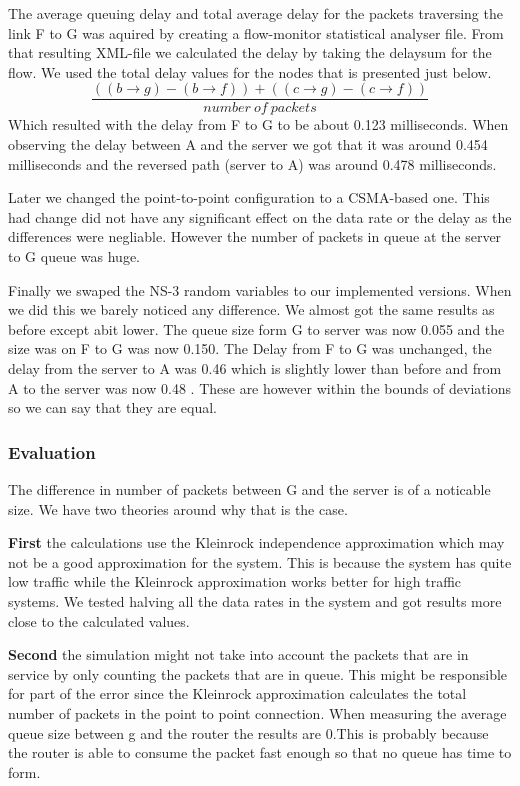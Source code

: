 \documentclass{article}
\begin{document}
The average queuing delay and total average delay for the packets traversing the link F to G 
was aquired by creating a flow-monitor statistical analyser file. From that resulting XML-file 
we calculated the delay by taking the delaysum for the flow. We used the total delay values for 
the nodes that is presented just below.
$$\frac{((b \rightarrow g) - (b \rightarrow f)) + ((c \rightarrow g) - (c \rightarrow f))}{number\ of\ packets}$$
Which resulted with the delay from F to G to be about 0.123 milliseconds.  
When observing the delay between A and the server we got that it was around 0.454 milliseconds 
and the reversed path (server to A) was around 0.478 milliseconds. 

Later we changed the point-to-point configuration to a CSMA-based one. This had change did not 
have any significant effect on the data rate or the delay as the differences were negliable.
However the number of packets in queue at the server to G queue was huge.

Finally we swaped the NS-3 random variables to our implemented versions. When we did this we
barely noticed any difference. We almost got the same results as before except abit lower.
The queue size form G to server was now 0.055 and the size was on F to G was now 0.150. 
The Delay from F to G was unchanged, the delay from the server to A was 0.46 which is slightly 
lower than before and from A to the server was now 0.48 . These are however within the bounds 
of deviations so we can say that they are equal.


\subsubsection{Evaluation}
The difference in number of packets between G and the server is of a noticable size. We have 
two theories around why that is the case.

\textbf{First} the calculations use the Kleinrock independence approximation which may not be 
a good approximation for the system. This is because the system has quite low traffic while the 
Kleinrock approximation works better for high traffic systems. We tested halving all the data 
rates in the system and got results more close to the calculated values.

\textbf{Second} the simulation might not take into account the packets that are in service 
by only counting the packets that are in queue. This might be responsible for part of the 
error since the Kleinrock approximation calculates the total number of packets in the point 
to point connection. When measuring the average queue size between g and the router the 
results are 0.This is probably because the router is able to consume the packet fast enough 
so that no queue has time to form.
\end{document}
